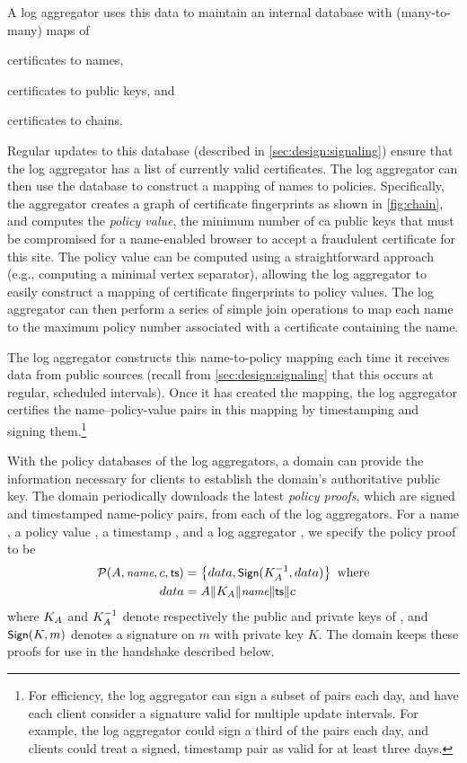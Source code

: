 A log aggregator uses this data to maintain an internal database with
(many-to-many) maps of
\begin{inparaenum}
\item certificates to names,
\item certificates to public keys, and
\item certificates to chains.
\end{inparaenum}
Regular updates to this database (described in \autoref{sec:design:signaling})
ensure that the log aggregator has a list of currently valid certificates. The
log aggregator can then use the database to construct a mapping of names to
policies. Specifically, the aggregator creates a graph of certificate
fingerprints as shown in \autoref{fig:chain}, and computes the \emph{policy
value}, the minimum number of \ac{ca} public keys that must be compromised 
for a \ac{name}-enabled browser to accept a fraudulent certificate for this site. 
The policy value can be computed using a
straightforward approach (e.g., computing a minimal vertex separator), allowing
the log aggregator to easily construct a mapping of certificate fingerprints to
policy values. The log aggregator can then perform a series of simple join
operations to map each name to the maximum policy number associated with a
certificate containing the name.

The log aggregator constructs this name-to-policy mapping each time it receives
data from public sources (recall from \autoref{sec:design:signaling} that this
occurs at regular, scheduled intervals). Once it has created the mapping, the log
aggregator certifies the name--policy-value pairs in this mapping by
timestamping and signing them.\footnote{For efficiency, the log aggregator can
  sign a subset of pairs each day, and have each client consider a signature
  valid for multiple update intervals. For example, the log aggregator could
  sign a third of the pairs each day, and clients could treat a signed,
timestamp pair as valid for at least three days.}

With the policy databases of the log aggregators, a domain can provide the
information necessary for clients to establish the domain's authoritative public
key. The domain periodically downloads the latest
\emph{policy proofs}, which are signed and timestamped name-policy pairs, from
each of the log aggregators. For a name \hostname, a policy value \policy, a
timestamp \timestamp, and a log aggregator \logagg, we specify the policy proof
to be
\begin{align*}
  \mathcal{P}(A, \small{\emph{name}}, c, \textsf{ts}) &= 
  \left\{data, \small{\textsf{Sign}}(K_{A}^{-1}, data)\right\} \mbox{ where} \\
  data &= A \| K_{A} \| \small{\emph{name}} \| \textsf{ts} \| c \\
\end{align*}
where $K_{A}$ and $K_{A}^{-1}$ denote respectively the public
and private keys of \logagg, and $\small{\textsf{Sign}}(K, m)$ denotes a signature on $m$
with private key $K$. The domain keeps these proofs for use in the handshake
described below.

